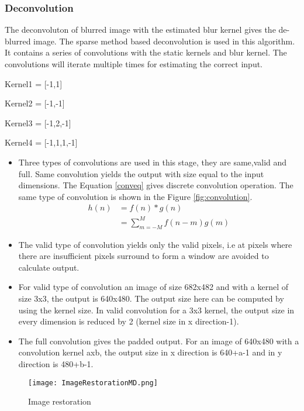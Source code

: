 \subsubsection{Deconvolution}
The deconvoluton of blurred image with the estimated blur kernel gives the de-blurred image. The sparse method based deconvolution is used in this algorithm. It contains a series of convolutions with the static kernels and blur kernel. The convolutions will iterate multiple times for estimating the correct input.\par\noindent
Kernel1 = [-1,1] \par\noindent
Kernel2 = [-1,-1] \par\noindent
Kernel3 = [-1,2,-1]\par\noindent
Kernel4 = [-1,1,1,-1]\par\noindent
\begin{itemize}
\item Three types of convolutions are used in this stage, they are same,valid and full. Same convolution yields the output with size equal to the input dimensions. The Equation \ref{conveq} gives discrete convolution operation. The same type of convolution is shown in the Figure \ref{fig:convolution}.
\begin{equation}\label{conveq}
\begin{split}
	h(n)&=f(n)*g(n) \\
	&=\sum_{m=-M}^{M} f(n-m)g(m)
\end{split}
\end{equation}
\item The valid type of convolution yields only the valid pixels, i.e at pixels where there are insufficient pixels surround to form a window are avoided to calculate output.
\item For valid type of convolution an image of size 682x482 and with a kernel of size 3x3, the output is 640x480. The output size here can be computed by using the kernel size. In valid convolution for a 3x3 kernel, the output size in every dimension is reduced by 2 (kernel size in x direction-1).
\item The full convolution gives the padded output. For an image of 640x480 with a convolution kernel axb, the output size in x direction is 640+a-1 and in y direction is 480+b-1.
\end{itemize}
\begin{figure}[h!]
	\centering
	\texttt{[image: ImageRestorationMD.png]}
	\caption{Image restoration}
	\label{deconv}
\end{figure}

